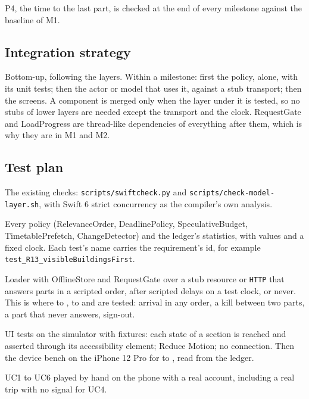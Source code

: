 P4, the time to the last part, is checked at the end of every milestone against the
baseline of M1.

\subsection{Integration strategy}
Bottom-up, following the layers. Within a milestone: first the policy, alone, with
its unit tests; then the actor or model that uses it, against a stub transport;
then the screens. A component is merged only when the layer under it is tested, so
no stubs of lower layers are needed except the transport and the clock.
RequestGate and LoadProgress are thread-like dependencies of everything after them,
which is why they are in M1 and M2.

\subsection{Test plan}
\begin{description}[style=nextline, leftmargin=1.5em]
  \item[Static analysis] The existing checks: \texttt{scripts/swiftcheck.py} and \texttt{scripts/check-model-layer.sh}, with Swift 6 strict concurrency as the compiler's own analysis.
  \item[Unit] Every policy (RelevanceOrder, DeadlinePolicy, SpeculativeBudget, TimetablePrefetch, ChangeDetector) and the ledger's statistics, with values and a fixed clock. Each test's name carries the requirement's id, for example \texttt{test\_R13\_visibleBuildingsFirst}.
  \item[Integration] Loader with OfflineStore and RequestGate over a stub resource or \texttt{HTTP} that answers parts in a scripted order, after scripted delays on a test clock, or never. This is where  to ,  to  and  are tested: arrival in any order, a kill between two parts, a part that never answers, sign-out.
  \item[System] UI tests on the simulator with fixtures: each state of a section is reached and asserted through its accessibility element; Reduce Motion; no connection. Then the device bench on the iPhone 12 Pro for  to , read from the ledger.
  \item[Acceptance] UC1 to UC6 played by hand on the phone with a real account, including a real trip with no signal for UC4.
\end{description}

